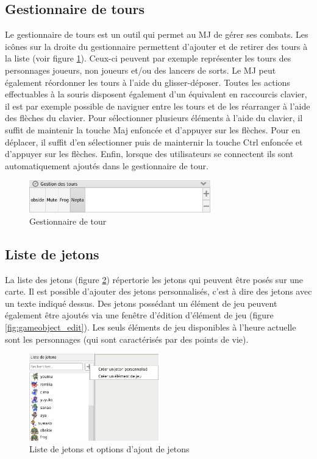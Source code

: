 \subsection{Gestionnaire de tours}
Le gestionnaire de tours est un outil qui permet au MJ de gérer ses combats. Les icônes sur la droite du gestionnaire permettent d'ajouter et de retirer des tours à la liste (voir figure \ref{fig:turnManager}). Ceux-ci peuvent par exemple représenter les tours des personnages joueurs, non joueurs et/ou des lancers de sorts. Le MJ peut également réordonner les tours à l'aide du glisser-déposer. Toutes les actions effectuables à la souris disposent également d'un équivalent en raccourcis clavier, il est par exemple possible de naviguer entre les tours et de les réarranger à l'aide des flèches du clavier. Pour sélectionner plusieurs éléments à l'aide du clavier, il suffit de maintenir la touche Maj enfoncée et d'appuyer sur les flèches. Pour en déplacer, il suffit d'en sélectionner puis de mainternir la touche Ctrl enfoncée et d'appuyer sur les flèches. Enfin, lorsque des utilisateurs se connectent ils sont automatiquement ajoutés dans le gestionnaire de tour.

\begin{figure}[h!]
	\centering
	\includegraphics[width=0.7\textwidth]{img/turn_manager.png}
	\caption{Gestionnaire de tour}
	\label{fig:turnManager}
\end{figure}
\newpage

\subsection{Liste de jetons}
La liste des jetons (figure \ref{fig:tokenmenu}) répertorie les jetons qui peuvent être posés sur une carte. Il est possible d'ajouter des jetons personnalisés, c'est à dire des jetons avec un texte indiqué dessus. Des jetons possédant un élément de jeu peuvent également être ajoutés via une fenêtre d'édition d'élément de jeu (figure \ref{fig:gameobject_edit}). Les seuls éléments de jeu disponibles à l'heure actuelle sont les personnages (qui sont caractérisés par des points de vie).

\begin{figure}[h!]
	\centering
	\includegraphics[width=0.5\textwidth]{img/tokenmenu.png}
	\caption{Liste de jetons et options d'ajout de jetons}
	\label{fig:tokenmenu}
\end{figure}

